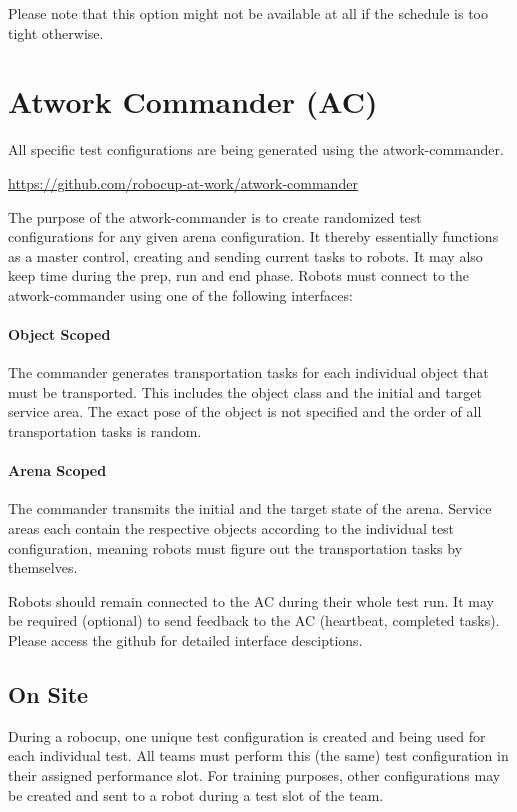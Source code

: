 Please note that this option might not be available at all if the schedule is too tight otherwise.

\section{Atwork Commander (AC)}
\label{sec:atwork-commander}

All specific test configurations are being generated using the atwork-commander.

\begin{center}
	\url{https://github.com/robocup-at-work/atwork-commander}
\end{center}

The purpose of the atwork-commander is to create randomized test configurations for any given arena configuration.
It thereby essentially functions as a master control, creating and sending current tasks to robots.
It may also keep time during the prep, run and end phase.
Robots must connect to the atwork-commander using one of the following interfaces:

\paragraph{Object Scoped}
The commander generates transportation tasks for each individual object that must be transported.
This includes the object class and the initial and target service area.
The exact pose of the object is not specified and the order of all transportation tasks is random.

\paragraph{Arena Scoped}
The commander transmits the initial and the target state of the arena.
Service areas each contain the respective objects according to the individual test configuration,
meaning robots must figure out the transportation tasks by themselves.

Robots should remain connected to the AC during their whole test run.
It may be required (optional) to send feedback to the AC (heartbeat, completed tasks).
Please access the github for detailed interface desciptions.

\subsection{On Site}

During a robocup, one unique test configuration is created and being used for each individual test.
All teams must perform this (the same) test configuration in their assigned performance slot.
For training purposes, other configurations may be created and sent to a robot during a test slot of the team.


